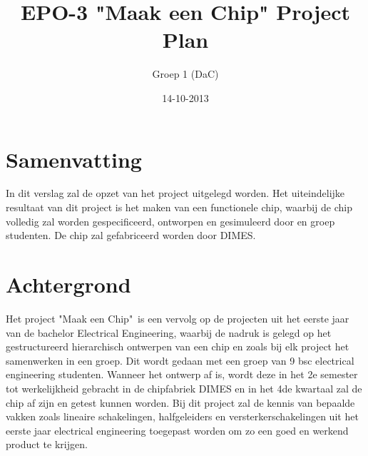 \documentclass{scrartcl}
\author{Groep 1 (DaC)}
\title{EPO-3 "Maak een Chip" Project Plan}
\date{14-10-2013}
\begin{document}
\maketitle
\vspace{80 mm}
\section*{Samenvatting}
In dit verslag zal de opzet van het project uitgelegd worden. Het uiteindelijke resultaat van dit project is het maken van een functionele chip, waarbij de chip volledig zal worden gespecificeerd, ontworpen en gesimuleerd door en groep studenten. De chip zal gefabriceerd worden door DIMES. 
\newpage
\setlength{\cftbeforetoctitleskip}{-3em}

\tableofcontents
\newpage
{}
\section{Achtergrond}
Het project "Maak een Chip"\ is een vervolg op de projecten uit het eerste jaar van de bachelor Electrical Engineering, waarbij de nadruk is gelegd op het gestructureerd hierarchisch ontwerpen van een chip en zoals bij elk project het samenwerken in een groep. Dit wordt gedaan met een groep van 9 bsc electrical engineering studenten. Wanneer het ontwerp af is, wordt deze in het 2e semester tot werkelijkheid gebracht in de chipfabriek DIMES en in het 4de kwartaal zal de chip af zijn en getest kunnen worden. Bij dit project zal de kennis van bepaalde vakken zoals lineaire schakelingen, halfgeleiders en versterkerschakelingen uit het eerste jaar electrical engineering toegepast worden om zo een goed en werkend product te krijgen.
\end{document}
